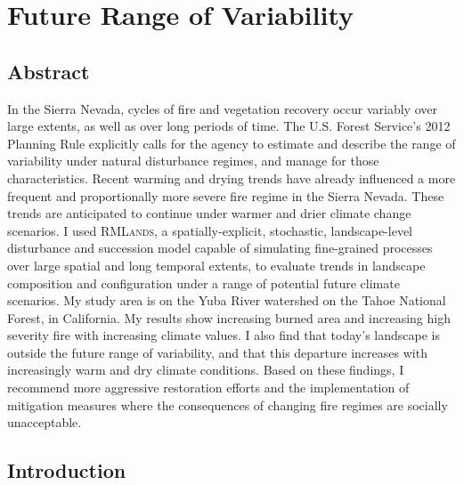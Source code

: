 
\chapter{Future Range of Variability}
\label{ch:FRV}

\section{Abstract}
In the Sierra Nevada, cycles of fire and vegetation recovery occur variably over large extents, as well as over long periods of time. The U.S. Forest Service's 2012 Planning Rule explicitly calls for the agency to estimate and describe the range of variability under natural disturbance regimes, and manage for those characteristics. Recent warming and drying trends have already influenced a more frequent and proportionally more severe fire regime in the Sierra Nevada. These trends are anticipated to continue under warmer and drier climate change scenarios. I used \textsc{RMLands}, a spatially-explicit, stochastic, landscape-level disturbance and succession model capable of simulating fine-grained processes over large spatial and long temporal extents, to evaluate trends in landscape composition and configuration under a range of potential future climate scenarios. My study area is on the Yuba River watershed on the Tahoe National Forest, in California. My results show increasing burned area and increasing high severity fire with increasing climate values. I also find that today's landscape is outside the future range of variability, and that this departure increases with increasingly warm and dry climate conditions. Based on these findings, I recommend more aggressive restoration efforts and the implementation of mitigation measures where the consequences of changing fire regimes are socially unacceptable.



\section{Introduction}
